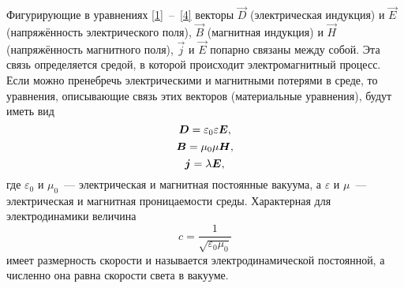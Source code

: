 Фигурирующие в уравнениях \eqref{1}~--~\eqref{4} векторы $\vec{D}$ (электрическая индукция) и $\vec{E}$ (напряжённость электрического
поля), $\vec{B}$ (магнитная индукция) и $\vec{H}$ (напряжённость магнитного поля), $\vec{j}$ и $\vec{E}$ попарно связаны между собой.
Эта связь определяется средой, в которой происходит электромагнитный процесс. Если можно пренебречь электрическими и
магнитными потерями в среде, то уравнения, описывающие связь этих векторов (материальные уравнения), будут иметь вид
\begin{equation} \eqmark{5}
\vec{D}=\varepsilon_0\varepsilon\vec{E},
\end{equation}
\begin{equation} \eqmark{6}
\vec{B}=\mu_0\mu\vec{H},
\end{equation}
\begin{equation} \eqmark{7}
\vec{j}=\lambda\vec{E},
\end{equation}
где $\varepsilon_0$ и $\mu_0$~--- электрическая и магнитная постоянные вакуума, а $\varepsilon$ и $\mu$~--- электрическая и магнитная
проницаемости среды. Характерная для электродинамики величина
\[
c=\frac{1}{\sqrt{\varepsilon_0\mu_0}}
\]
имеет размерность скорости и называется электродинамической постоянной, а численно она равна скорости света в вакууме.



